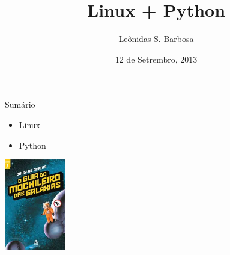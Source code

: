\documentclass{beamer}
\begin{document}
\title{Linux + Python}  
\author{Le\^onidas S. Barbosa}

\date[Setembro 2013]{12 de Setrembro, 2013} 

\frame{\titlepage} 

\begin{frame}{Sum\'ario}
 
\begin{itemize}
  \item Linux
  \item Python
\end{itemize}

\end{frame}

\begin{frame}
 

\end{frame}

\begin{frame}
\begin{center}

\includegraphics[width=0.2\textwidth]{images/guia.jpg} 
\end{center}
\end{frame}

\begin{frame}
 
\end{frame}


\begin{frame}
 

\end{frame}
\end{document}
